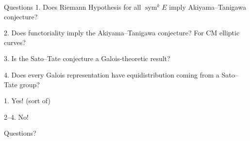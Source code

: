 \documentclass[handout]{beamer}
\DeclareMathOperator{\sym}{sym}
\begin{document}
\begin{frame}{Questions}
1. Does Riemann Hypothesis for all $\sym^k E$ imply Akiyama--Tanigawa conjecture? 
\pause

2. Does functoriality imply the Akiyama--Tanigawa conjecture? \pause 
For CM elliptic curves?
\pause

3. Is the Sato--Tate conjecture a Galois-theoretic result?
\pause

4. Does every Galois representation have equidistribution coming from a 
Sato--Tate group?
\pause

1. Yes! (sort of)
\pause

2--4. No!
\end{frame}





\begin{frame}
\begin{center}
\Huge Questions?
\end{center}
\end{frame}
\end{document}
